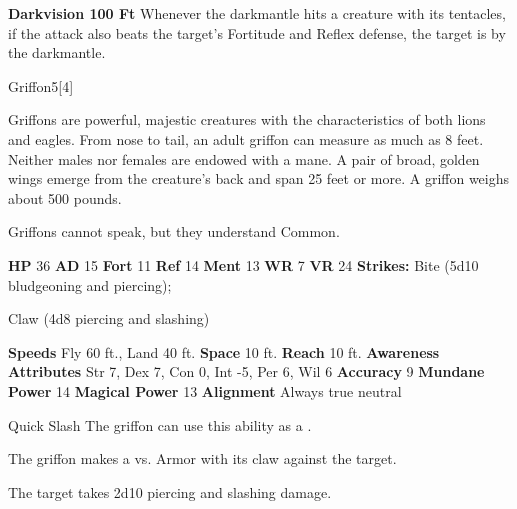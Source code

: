   \par \textbf{Darkvision 100 Ft}
          Whenever the darkmantle hits a creature with its tentacles, if the attack also beats the target's Fortitude and Reflex defense,
          the target is  by the darkmantle.
  
  \begin{monsection}{Griffon}{5}[4]
    \vspace{-1em}\vspace{-1em}
    \vspace{0em}

    
      Griffons are powerful, majestic creatures with the characteristics of both lions and eagles.
      From nose to tail, an adult griffon can measure as much as 8 feet.
      Neither males nor females are endowed with a mane.
      A pair of broad, golden wings emerge from the creature’s back and span 25 feet or more.
      A griffon weighs about 500 pounds.

      Griffons cannot speak, but they understand Common.
    
    

    \begin{spellcontent}
      \begin{spelltargetinginfo}
        \pari \textbf{HP} 36 \monsep
          \textbf{AD} 15 \monsep
          \textbf{Fort} 11 \monsep
          \textbf{Ref} 14 \monsep
          \textbf{Ment} 13
        \pari \textbf{WR} 7 \monsep
        \textbf{VR} 24
        \pari \textbf{Strikes:}
            Bite  (5d10 bludgeoning and piercing);
\par Claw  (4d8 piercing and slashing)
      \end{spelltargetinginfo}
    \end{spellcontent}
    \begin{monsterfooter}
      \pari \textbf{Speeds} Fly 60 ft., Land 40 ft. \monsep
        \textbf{Space} 10 ft. \monsep
        \textbf{Reach} 10 ft.
      \pari \textbf{Awareness} 
      \pari \textbf{Attributes}
        Str 7, Dex 7,
        Con 0, Int -5,
        Per 6, Wil 6
      \pari \textbf{Accuracy} 9 \monsep
        \textbf{Mundane Power} 14 \monsep
      \textbf{Magical Power} 13
      \pari \textbf{Alignment} Always true neutral
    \end{monsterfooter}
  \end{monsection}
  \begin{freeability}{Quick Slash}
      The griffon can use this ability as a .\par The griffon makes a 
         vs. Armor
        with its claw against the target.
    
    \hit The target takes 2d10 piercing and slashing damage.
    \end{freeability}
  
